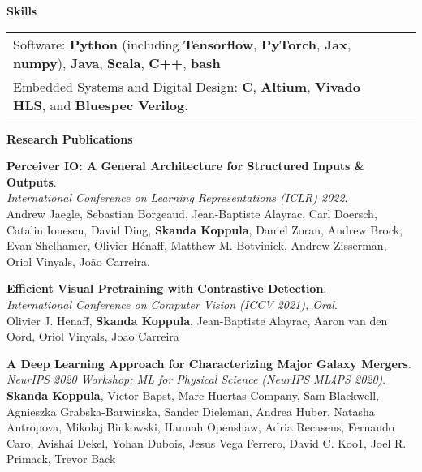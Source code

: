 \documentclass[letterpaper,11pt]{article}
\begin{document}
    \vspace{0.05in}

\large \textbf{Skills\vspace{1mm}} \normalsize
	 \begin{tabular*}{7in}{l@{\extracolsep{\fill}}r}
	     \hspace{2mm} Software: \textbf{Python} (including \textbf{Tensorflow}, \textbf{PyTorch}, \textbf{Jax}, \textbf{numpy}), \textbf{Java}, \textbf{Scala}, \textbf{C++}, \textbf{bash}  \\
         \hspace{2mm} Embedded Systems and Digital Design: \textbf{C}, \textbf{Altium}, \textbf{Vivado HLS}, and \textbf{Bluespec Verilog}. \\
         
	\end{tabular*}

\vspace{0.2in}

\large \textbf{Research Publications\vspace{1mm}} \normalsize
    \vspace{0.05in}

\textbf{Perceiver IO: A General Architecture for Structured Inputs \& Outputs}. \\
\textit{International Conference on Learning Representations (ICLR) 2022}. \\
Andrew Jaegle, Sebastian Borgeaud, Jean-Baptiste Alayrac, Carl Doersch, Catalin Ionescu, David Ding, \textbf{Skanda Koppula}, Daniel Zoran, Andrew Brock, Evan Shelhamer, Olivier Hénaff, Matthew M. Botvinick, Andrew Zisserman, Oriol Vinyals, João Carreira.

\vspace{0.1in}

\textbf{Efficient Visual Pretraining with Contrastive Detection}. \\
\textit{International Conference on Computer Vision (ICCV 2021), Oral}. \\
Olivier J. Henaff, \textbf{Skanda Koppula}, Jean-Baptiste Alayrac, Aaron van den Oord, Oriol Vinyals, Joao Carreira

\vspace{0.1in}

\textbf{A Deep Learning Approach for Characterizing Major Galaxy Mergers}. \\
\textit{NeurIPS 2020 Workshop: ML for Physical Science (NeurIPS ML4PS 2020)}. \\
\textbf{Skanda Koppula}, Victor Bapst, Marc Huertas-Company, Sam Blackwell, Agnieszka Grabska-Barwinska, Sander Dieleman, 
Andrea Huber, Natasha Antropova, Mikolaj Binkowski, Hannah Openshaw, Adria Recasens, Fernando Caro, Avishai Dekel, Yohan Dubois, Jesus Vega Ferrero, David C. Koo1, Joel R. Primack, Trevor Back
\end{document}
